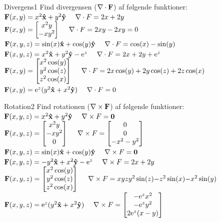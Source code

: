 \begin{opgave}{Divergens}{1}
Find divergensen ($\mathbf{\nabla} \cdot \mathbf{F}$) af følgende funktioner:
\opg$\mathbf{F}(x,y) = x^2\mathbf{\hat{x}}+y^2\mathbf{\hat{y}}~~~~\mathbf{\nabla}\cdot F = 2x+2y$
\opg$\mathbf{F}(x,y) = \begin{bmatrix} x^2y \\ -xy^2 \end{bmatrix}~~~~\mathbf{\nabla}\cdot F = 2xy-2xy= 0$
\opg$\mathbf{F}(x,y,z) = \sin(x)\mathbf{\hat{x}}+\cos(y)\mathbf{\hat{y}}~~~~\mathbf{\nabla} \cdot F = \cos(x)-\sin(y)$
\opg$\mathbf{F}(x,y,z) = x^2\mathbf{\hat{x}}+y^2\mathbf{\hat{y}}-\mathrm{e}^z~~~~\mathbf{\nabla}\cdot F = 2x+2y+\mathrm{e}^z$
\opg$\mathbf{F}(x,y) = \begin{bmatrix} x^2\cos(y) \\ y^2\cos(z) \\ z^2\cos(x) \end{bmatrix}~~~~\mathbf{\nabla}\cdot F = 2x\cos(y)+2y\cos(z)+2z\cos(x)$
\opg$\mathbf{F}(x,y) = \mathrm{e}^z(y^2\mathbf{\hat{x}}+x^2\mathbf{\hat{y}})~~~~\mathbf{\nabla}\cdot F = 0$
\end{opgave}

\begin{opgave}{Rotation}{2}
Find rotationen ($\mathbf{\nabla} \times \mathbf{F}$) af følgende funktioner:
\opg$\mathbf{F}(x,y,z) = x^2\mathbf{\hat{x}}+y^2\mathbf{\hat{y}} ~~~~\mathbf{\nabla} \times F = \mathbf{0}$
\opg$\mathbf{F}(x,y,z) = \begin{bmatrix} x^2y \\ -xy^2 \\ 0 \end{bmatrix} ~~~~\mathbf{\nabla} \times F =\begin{bmatrix} 0 \\ 0 \\ -x^2-y^2 \end{bmatrix}$
\opg$\mathbf{F}(x,y,z) = \sin(x)\mathbf{\hat{x}}+\cos(y)\mathbf{\hat{y}} ~~~~\mathbf{\nabla} \times F =\mathbf{0}$
\opg$\mathbf{F}(x,y,z) = -y^2\mathbf{\hat{x}}+x^2\mathbf{\hat{y}}-\mathrm{e}^z ~~~~\mathbf{\nabla} \times F =2x+2y$
\opg$\mathbf{F}(x,y,z) = \begin{bmatrix} x^2\cos(y) \\ y^2\cos(z) \\ z^2\cos(x) \end{bmatrix} ~~~~\mathbf{\nabla} \times F =xyz{y^2\sin(z)}{-z^2\sin(x)}{-x^2\sin(y)}$
\opg$\mathbf{F}(x,y,z) = \mathrm{e}^z(y^2\mathbf{\hat{x}}+x^2\mathbf{\hat{y}}) ~~~~\mathbf{\nabla} \times F =\begin{bmatrix} -\mathrm{e}^zx^2 \\ -\mathrm{e}^zy^2 \\ 2\mathrm{e}^z(x-y) \end{bmatrix}$
\end{opgave}


